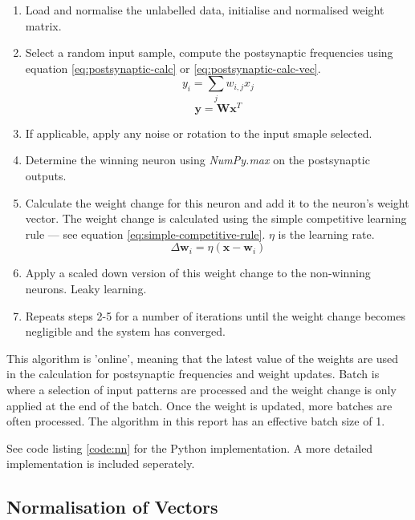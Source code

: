 \documentclass[11pt,journal,transmag,final]{IEEEtran}
\begin{document}
\begin{enumerate}
    \item Load and normalise the unlabelled data, initialise and normalised weight matrix.
    \item Select a random input sample, compute the postsynaptic frequencies using equation \ref{eq:postsynaptic-calc} or \ref{eq:postsynaptic-calc-vec}.
    \begin{equation}
        y_i = \sum_j w_{i, j}x_j
        \label{eq:postsynaptic-calc}
    \end{equation}
    \begin{equation}
        \textbf{y} = \textbf{W}\textbf{x}^{T}
        \label{eq:postsynaptic-calc-vec}
    \end{equation}
    \item If applicable, apply any noise or rotation to the input smaple selected.
    \item Determine the winning neuron using \textit{NumPy.max} on the postsynaptic outputs.
    \item Calculate the weight change for this neuron and add it to the neuron's weight vector. The weight change is calculated using the simple competitive learning rule --- see equation \ref{eq:simple-competitive-rule}. $\eta$ is the learning rate.
    \begin{equation}
        \Delta \textbf{w}_{i} = \eta (\textbf{x} - \textbf{w}_{i})
        \label{eq:simple-competitive-rule}
    \end{equation}
    \item Apply a scaled down version of this weight change to the non-winning neurons. Leaky learning.
    \item Repeats steps 2-5 for a number of iterations until the weight change becomes negligible and the system has converged. 
\end{enumerate}

This algorithm is 'online', meaning that the latest value of the weights are used in the calculation for postsynaptic frequencies and weight updates. Batch is where a selection of input patterns are processed and the weight change is only applied at the end of the batch. Once the weight is updated, more batches are often processed. The algorithm in this report has an effective batch size of 1.

See code listing \ref{code:nn} for the Python implementation. A more detailed implementation is included seperately.

\subsection{Normalisation of Vectors}
\end{document}
